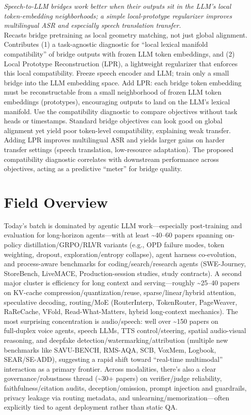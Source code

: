 \documentclass[12pt,letterpaper]{article}
\begin{document}
{\small\textit{Speech-to-LLM bridges work better when their outputs sit in the LLM's local token-embedding neighborhoods; a simple local-prototype regularizer improves multilingual ASR and especially speech translation transfer.}}\\[1pt]
{\footnotesize Recasts bridge pretraining as local geometry matching, not just global alignment. Contributes (1) a task-agnostic diagnostic for ``local lexical manifold compatibility'' of bridge outputs with frozen LLM token embeddings, and (2) Local Prototype Reconstruction (LPR), a lightweight regularizer that enforces this local compatibility. Freeze speech encoder and LLM; train only a small bridge into the LLM embedding space. Add LPR: each bridge token embedding must be reconstructable from a small neighborhood of frozen LLM token embeddings (prototypes), encouraging outputs to land on the LLM's lexical manifold. Use the compatibility diagnostic to compare objectives without task heads or timestamps. Standard bridge objectives can look good on global alignment yet yield poor token-level compatibility, explaining weak transfer. Adding LPR improves multilingual ASR and yields larger gains on harder transfer settings (speech translation, low-resource adaptation). The proposed compatibility diagnostic correlates with downstream performance across objectives, acting as a predictive ``meter'' for bridge quality.}

\medskip



\section*{Field Overview}
{\footnotesize Today's batch is dominated by agentic LLM work---especially post-training and evaluation for long-horizon agents---with at least \textasciitilde{}40--60 papers spanning on-policy distillation/GRPO/RLVR variants (e.g., OPD failure modes, token weighting, dropout, exploration/entropy collapse), agent harness co-evolution, and process-aware benchmarks for coding/search/research agents (SWE-Journey, StoreBench, LiveMACE, Production-session studies, study contracts). A second major cluster is efficiency for long context and serving---roughly \textasciitilde{}25--40 papers on KV-cache compression/quantization/reuse, sparse/linear/hybrid attention, speculative decoding, routing/MoE (RouterInterp, TokenRouter, PageWeaver, RaReCache, VFold, Read-What-Matters, hybrid long-context mechanics). The most surprising concentration is audio/speech: well over \textasciitilde{}150 papers on full‑duplex voice agents, speech LLMs, TTS control/steering, spatial audio-visual reasoning, and deepfake detection/watermarking/attribution (multiple new benchmarks like SAVU-BENCH, RMS-AQA, SCB, VoxMem, Logbook, SEAR/SE-ADD), suggesting a rapid shift toward ``real-time multimodal'' interaction as a primary frontier. Across modalities, there's also a clear governance/robustness thread (\textasciitilde{}30+ papers) on verifier/judge reliability, faithfulness/citation audits, deception/omission, prompt injection and guardrails, privacy leakage via routing metadata, and unlearning/memorization---often explicitly tied to agent deployment rather than static QA.}
\end{document}
